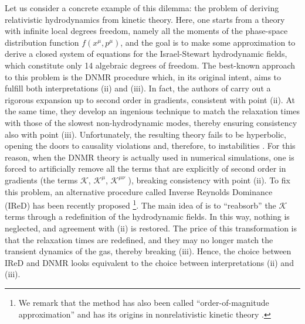 \documentclass[a4paper, amsfonts, amssymb, amsmath, reprint, showkeys, nofootinbib, twoside, onecolumn,notitlepage]{revtex4-2}
\begin{document}
Let us consider a concrete example of this dilemma: the problem of deriving relativistic hydrodynamics from kinetic theory. Here, one starts from a theory with infinite local degrees freedom, namely all the moments of the phase-space distribution function $f(x^\mu,p^\mu)$, and the goal is to make some approximation to derive a closed system of equations for the Israel-Stewart hydrodynamic fields, which constitute only 14 algebraic degrees of freedom. The best-known approach to this problem is the DNMR procedure \cite{Denicol2012Boltzmann} which, in its original intent, aims to fulfill both interpretations (ii) and (iii). In fact, the authors of \cite{Denicol2012Boltzmann} carry out a rigorous expansion up to second order in gradients, consistent with point (ii). At the same time, they develop an ingenious technique to match the relaxation times with those of the slowest non-hydrodynamic modes, thereby ensuring consistency also with point (iii). Unfortunately, the resulting theory fails to be hyperbolic, opening the doors to causality violations and, therefore, to instabilities \cite{GavassinoSuperluminal2021,GavassinoBounds2023}. For this reason, when the DNMR theory is actually used in numerical simulations, one is forced to artificially remove all the terms that are explicitly of second order in gradients (the terms $\mathcal{K}$, $\mathcal{K}^\mu$, $\mathcal{K}^{\mu \nu}$ \cite{Denicol2012Boltzmann, Molnar:2013lta,Denicol:2012vq}), breaking consistency with point (ii). To fix this problem, an alternative procedure called Inverse Reynolds Dominance (IReD) has been recently proposed \cite{WagnerIReD2022}\footnote{We remark that the method has also been called ``order-of-magnitude approximation'' \cite{Fotakis:2022usk, Rocha:2023hts} and has its origins in nonrelativistic kinetic theory \cite{Struchtrup}.}. The main idea of \cite{WagnerIReD2022} is to ``reabsorb'' the $\mathcal{K}$ terms through a redefinition of the hydrodynamic fields. In this way, nothing is neglected, and agreement with (ii) is restored. The price of this transformation is that the relaxation times are redefined, and they may no longer match the transient dynamics of the gas, thereby breaking (iii). Hence, the choice between IReD and DNMR looks equivalent to the choice between interpretations (ii) and (iii).
\end{document}

